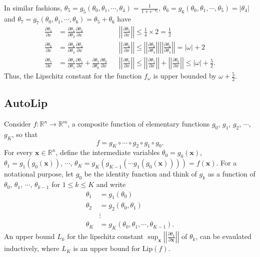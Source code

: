 \documentclass[11pt]{report}
\newcommand\lip{\ensuremath{\text{Lip}}}
\newcommand\pa[2]{\ensuremath{\frac{\partial #1}{\partial #2}}}
\newcommand\norm[1]{\ensuremath{\left|\left|#1\right|\right|}}
\begin{document}
In similar fashions,
\(\theta_5=g_5(\theta_0,\theta_1,\cdots,\theta_4)=\frac1{1+e^{-\theta_3}}\),
\(\theta_6=g_6(\theta_0,\theta_1,\cdots,\theta_5)=|\theta_4|\) and
\(\theta_7=g_7(\theta_0,\theta_1,\cdots,\theta_6)=\theta_5+\theta_6\) have
\begin{align*}
\pa{\theta_5}x&=\pa{\theta_5}{\theta_3}\pa{\theta_3}x&&\norm{\pa{\theta_5}x}\le\frac14\times2=\frac12\\
\pa{\theta_6}x&=\pa{\theta_6}{\theta_4}\pa{\theta_4}x&&\norm{\pa{\theta_6}x}
\le\norm{\pa{\theta_6}{\theta_4}}\norm{\pa{\theta_6}{\theta_4}}=|\omega|+2\\
\pa{\theta_7}x&=\pa{\theta_7}{\theta_5}\pa{\theta_5}x+\pa{\theta_7}{\theta_6}\pa{\theta_6}x&&\norm{\pa{\theta_7}x}
\le\norm{\pa{\theta_5}x}+\norm{\pa{\theta_6}x}\le|\omega|+\frac52.
\end{align*}
Thus, the Lipschitz constant for the function \(f_\omega\) is upper bounded by \(\omega+\frac52\).

\subsection{AutoLip}
Consider \(f:\mathbb R^n\to\mathbb R^m\), a composite function of elementary functions \(g_0\), \(g_1\), \(g_2\), \(\cdots\), \(g_K\), so that
\[f={g_K}\circ\cdots\circ{g_2}\circ{g_1}\circ{g_0}.\]
For every \(\boldsymbol x\in\mathbb R^n\), define the intermediate variables
\(\theta_0=g_0(\boldsymbol x)\), \(\theta_1=g_1(g_0(\boldsymbol x))\), \(\cdots\), \(\theta_K=g_K(g_{K-1}(\cdots g_1(g_0(\boldsymbol x))))=f(\boldsymbol x)\).
For a notational purpose, let \(g_0\) be the identity function and think of \(g_k\) as a function of \(\theta_0\), \(\theta_1\), \(\cdots\), \(\theta_{k-1}\) for \(1\le k\le K\) and write
\begin{align*}
\theta_1&=g_1(\theta_0)\\
\theta_2&=g_2(\theta_0,\theta_1)\\
&\vdots\\
\theta_K&=g_K(\theta_0,\theta_1,\cdots,\theta_{K-1}).
\end{align*}
An upper bound \(L_k\) for the lipschitz constant \(\sup_{\boldsymbol x}\left|\left|\frac{\partial\theta_k}{\partial\boldsymbol x}\right|\right|\) of \(\theta_k\), can be evaulated inductively, where \(L_K\) is an upper bound for \(\lip(f)\).
\end{document}

